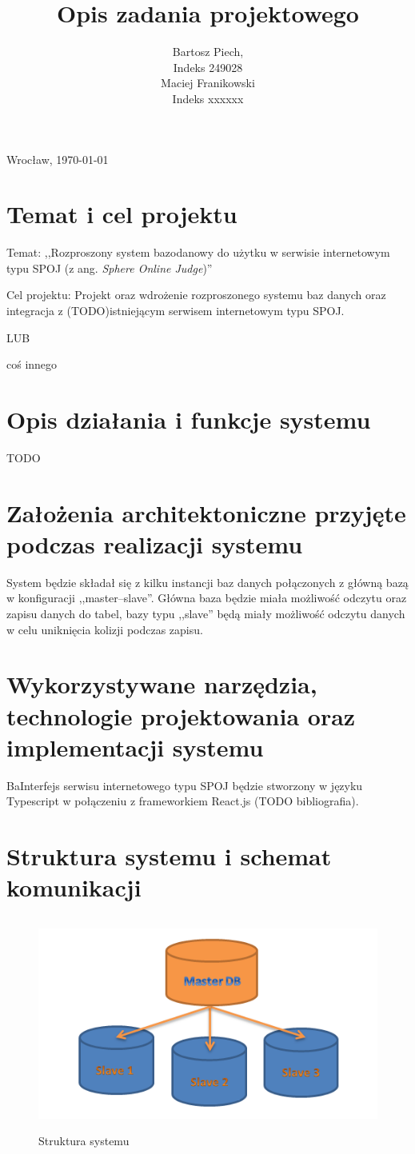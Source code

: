 \documentclass[10pt, a4paper]{article}
\author{Bartosz Piech,\\Indeks 249028\\Maciej Franikowski\\Indeks xxxxxx}
\title{Opis zadania projektowego}
\newcommand{\place}{Wrocław}
\begin{document}
	\hfill{\place, \today}

	\noindent
	\@author
	\begin{center}
		\Large{\@title}
	\end{center}

\section{Temat i cel projektu}
\indent
Temat: ,,Rozproszony system bazodanowy do użytku w serwisie internetowym typu SPOJ (z ang. \textit{Sphere Online Judge})''

\indent
Cel projektu: Projekt oraz wdrożenie rozproszonego systemu baz danych oraz integracja z (TODO)istniejącym serwisem internetowym typu SPOJ.

LUB

coś innego
\section{Opis działania i funkcje systemu}
TODO
\section{Założenia architektoniczne przyjęte podczas realizacji systemu}
System będzie składał się z kilku instancji baz danych połączonych z główną bazą w konfiguracji ,,master--slave''. Główna baza będzie miała możliwość odczytu oraz zapisu danych do tabel, bazy typu ,,slave'' będą miały możliwość odczytu danych w celu uniknięcia kolizji podczas zapisu. 
\section{Wykorzystywane narzędzia, technologie projektowania oraz implementacji systemu}
BaInterfejs serwisu internetowego typu SPOJ będzie stworzony w języku Typescript w połączeniu z frameworkiem React.js (TODO bibliografia). 
\section{Struktura systemu i schemat komunikacji}
\begin{figure}[h]
    \center
    \includegraphics[width=\linewidth, height=7cm]{img/struktura.png}
    \caption{Struktura systemu}
\end{figure}
\end{document}
